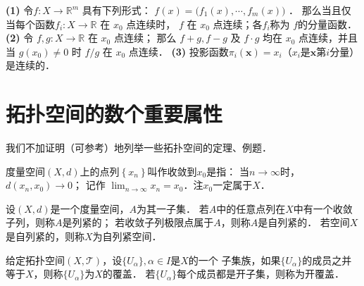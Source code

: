\begin{theorem}
    {\bfseries (1)} 令$f: X \rightarrow \mathbb{R}^m$ 具有下列形式：
    $    f(x)=\bigl(f_1(x), \cdots, f_m(x)\bigr)     $    ．
    那么当且仅当每个函数$f_{i}: X \rightarrow \mathbb{R}$ 在 $x_0$ 点连续时，
    $f$ 在 $x_0$ 点连续；各$f_i$称为 $f$的分量函数．    
    {\bfseries (2)} 令 $f, g: X \rightarrow \mathbb{R}$ 在 $x_0$ 点连续；
    那么 $f+g, f-g$ 及 $f \cdot g$ 均在 $x_0$ 点连续，并且当 $g(x_0) \neq 0$ 时 $f / g$ 在 $x_0$ 点连续．
    {\bfseries (3)} 投影函数$\pi_i(\boldsymbol{x})=x_i$（$x_i$是$\boldsymbol{x}$第$i$分量）是连续的．
\end{theorem}










\section{拓扑空间的数个重要属性}

我们不加证明（可参考\parencite{munkres-2000-topology}）地列举一些拓扑空间的定理、例题．



\begin{definition}
	度量空间$(X, d)$上的点列$\left\{x_n\right\}$叫作收敛到$x_0$是指：
	当$n \rightarrow \infty$时，$d\left(x_n, x_0\right) \rightarrow 0$；
	记作 $\lim _{n \rightarrow \infty} x_n=x_0$．注$x_0$一定属于$X$．
\end{definition}

    

\begin{definition}
	设$(X, d)$是一个度量空间，$A$为其一子集．
	若$A$中的任意点列在$X$中有一个收敛子列，则称$A$是{\heiti 列紧的}；
	若收敛子列极限点属于$A$，则称$A$是{\heiti 自列紧的}．
	若空间$X$是自列紧的，则称$X$为{\heiti 自列紧空间}．
\end{definition}


\begin{definition}\label{chtop:def_covering}
    给定拓扑空间$(X,\mathscr{T})$，设$\{U_\alpha\}, \alpha\in I$是$X$的一个
    子集族，如果$\{U_\alpha\}$的成员之并等于$X$，则称$\{U_\alpha\}$为$X$的{\heiti 覆盖}．
    若$\{U_\alpha\}$每个成员都是开子集，则称为{\heiti 开覆盖}．
\end{definition}

